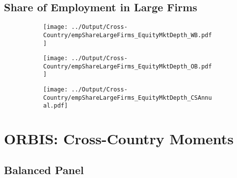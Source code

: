 \documentclass[12pt,notitlepage]{article}
\begin{document}
\subsection{Share of Employment in Large Firms}
\begin{figure}[!htpb]
\centering
\begin{subfigure}{.49\textwidth}
    \centering
 \texttt{[image: ../Output/Cross-Country/empShareLargeFirms\_EquityMktDepth\_WB.pdf]}
\end{subfigure}
\begin{subfigure}{.49\textwidth}
    \centering
  \texttt{[image: ../Output/Cross-Country/empShareLargeFirms\_EquityMktDepth\_OB.pdf]}
\end{subfigure}
\begin{subfigure}{.49\textwidth}
    \centering
  \texttt{[image: ../Output/Cross-Country/empShareLargeFirms\_EquityMktDepth\_CSAnnual.pdf]}
\end{subfigure}
\end{figure}

\clearpage

\section{ORBIS: Cross-Country Moments}

\subsection{Balanced Panel}
\begin{table}[!htpb]
\end{table}
\clearpage
\end{document}

